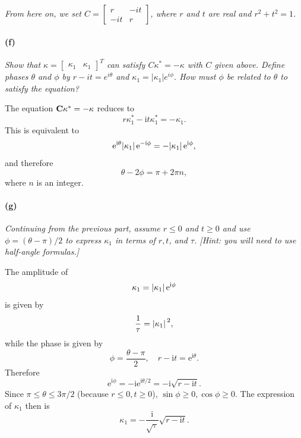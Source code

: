 \documentclass[hyperref, a4paper]{article}
\newcommand*{\ii}{\mathrm{i}}
\newcommand*{\ee}{\mathrm{e}}
\begin{document}
\textit{From here on, we set $C=\left[\begin{array}{cc}r & -i t \\ -i t & r\end{array}\right]$, where $r$ and $t$ are real and $r^2+t^2=1$.}

\paragraph*{(f)} \textit{Show that $\kappa=\left[\begin{array}{ll}\kappa_1 & \kappa_1\end{array}\right]^T$ can satisfy $C \kappa^*=-\kappa$ with $C$ given above. Define phases $\theta$ and $\phi$ by $r-i t=e^{i \theta}$ and $\kappa_1=\left|\kappa_1\right| e^{i \phi}$. How must $\phi$ be related to $\theta$ to satisfy the equation?} 
    
The equation $\vb{C} \vb{\kappa}^* = - \vb{\kappa}$ reduces to 
\begin{equation}
    r \kappa_1^* - \ii t \kappa_1^* = - \kappa_1.
\end{equation}
This is equivalent to 
\[
    \ee^{\ii \theta} \abs*{\kappa_1} \ee^{- \ii \phi} = - \abs*{\kappa_1} \ee^{\ii \phi},
\] 
and therefore 
\begin{equation}
    \theta - 2 \phi = \pi + 2 \pi n, 
\end{equation}
where $n$ is an integer.

\paragraph*{(g)} \textit{Continuing from the previous part, assume $r \leq 0$ and $t \geq 0$ and use $\phi=(\theta-\pi) / 2$ to express $\kappa_1$ in terms of $r, t$, and $\tau$. [Hint: you will need to use half-angle formulas.]} 

The amplitude of 
\begin{equation}
    \kappa_1 = \abs*{\kappa_1} \ee^{\ii \phi}
\end{equation}
is given by 
\[
    \frac{1}{\tau} = \abs*{\kappa_1}^2, 
\]
while the phase is given by 
\begin{equation}
    \phi = \frac{\theta - \pi}{2}, \quad 
    r - \ii t = \ee^{\ii \theta}.
\end{equation}
Therefore 
\begin{equation}
    \ee^{\ii \phi} = - \ii \ee^{\ii \theta / 2}
    = - \ii \sqrt{r - \ii t}.
\end{equation}
Since $\pi \leq \theta \leq 3\pi /2 $ (because $r \leq 0, t \geq 0$),
$\sin \phi \geq 0, \cos \phi \geq 0$.
The expression of $\kappa_1$ then is 
\begin{equation}
    \kappa_1 = - \frac{\ii}{\sqrt{\tau}} \sqrt{r - \ii t}.
\end{equation}
\end{document}
